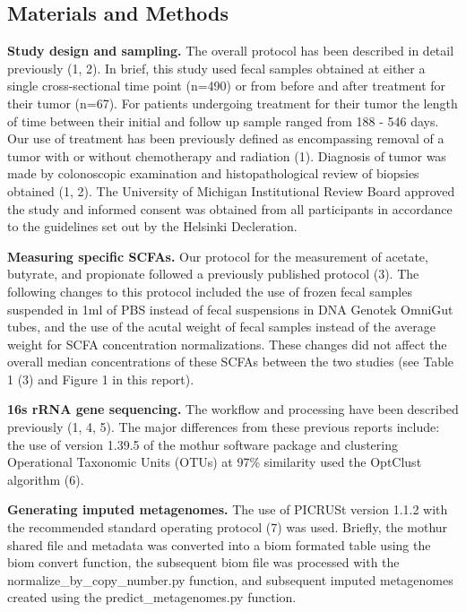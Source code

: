 \documentclass[11pt,]{article}
\begin{document}
\newpage

\subsection{Materials and Methods}\label{materials-and-methods}

\textbf{Study design and sampling.} The overall protocol has been
described in detail previously (1, 2). In brief, this study used fecal
samples obtained at either a single cross-sectional time point (n=490)
or from before and after treatment for their tumor (n=67). For patients
undergoing treatment for their tumor the length of time between their
initial and follow up sample ranged from 188 - 546 days. Our use of
treatment has been previously defined as encompassing removal of a tumor
with or without chemotherapy and radiation (1). Diagnosis of tumor was
made by colonoscopic examination and histopathological review of
biopsies obtained (1, 2). The University of Michigan Institutional
Review Board approved the study and informed consent was obtained from
all participants in accordance to the guidelines set out by the Helsinki
Decleration.

\textbf{Measuring specific SCFAs.} Our protocol for the measurement of
acetate, butyrate, and propionate followed a previously published
protocol (3). The following changes to this protocol included the use of
frozen fecal samples suspended in 1ml of PBS instead of fecal
suspensions in DNA Genotek OmniGut tubes, and the use of the acutal
weight of fecal samples instead of the average weight for SCFA
concentration normalizations. These changes did not affect the overall
median concentrations of these SCFAs between the two studies (see Table
1 (3) and Figure 1 in this report).

\textbf{16s rRNA gene sequencing.} The workflow and processing have been
described previously (1, 4, 5). The major differences from these
previous reports include: the use of version 1.39.5 of the mothur
software package and clustering Operational Taxonomic Units (OTUs) at
97\% similarity used the OptClust algorithm (6).

\textbf{Generating imputed metagenomes.} The use of PICRUSt version
1.1.2 with the recommended standard operating protocol (7) was used.
Briefly, the mothur shared file and metadata was converted into a biom
formated table using the biom convert function, the subsequent biom file
was processed with the normalize\_by\_copy\_number.py function, and
subsequent imputed metagenomes created using the predict\_metagenomes.py
function.
\end{document}
